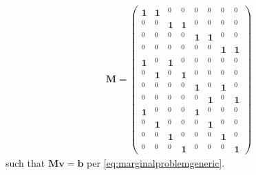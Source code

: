 \documentclass[aps,english,10pt,superscriptaddress,onecolumn,twoside,longbibliography,pra,floatfix,fleqn,nofootinbib]{revtex4-1}
\theoremstyle{definition}
\begin{document}
\begin{align}
\bm{M}=\begin{pmatrix}
 \bm{1} & \bm{1} & {\scriptscriptstyle ^0} & {\scriptscriptstyle ^0} & {\scriptscriptstyle ^0} & {\scriptscriptstyle ^0} & {\scriptscriptstyle ^0} & {\scriptscriptstyle ^0} \\
 {\scriptscriptstyle ^0} & {\scriptscriptstyle ^0} & \bm{1} & \bm{1} & {\scriptscriptstyle ^0} & {\scriptscriptstyle ^0} & {\scriptscriptstyle ^0} & {\scriptscriptstyle ^0} \\
 {\scriptscriptstyle ^0} & {\scriptscriptstyle ^0} & {\scriptscriptstyle ^0} & {\scriptscriptstyle ^0} & \bm{1} & \bm{1} & {\scriptscriptstyle ^0} & {\scriptscriptstyle ^0} \\
 {\scriptscriptstyle ^0} & {\scriptscriptstyle ^0} & {\scriptscriptstyle ^0} & {\scriptscriptstyle ^0} & {\scriptscriptstyle ^0} & {\scriptscriptstyle ^0} & \bm{1} & \bm{1} \\
 \bm{1} & {\scriptscriptstyle ^0} & \bm{1} & {\scriptscriptstyle ^0} & {\scriptscriptstyle ^0} & {\scriptscriptstyle ^0} & {\scriptscriptstyle ^0} & {\scriptscriptstyle ^0} \\
 {\scriptscriptstyle ^0} & \bm{1} & {\scriptscriptstyle ^0} & \bm{1} & {\scriptscriptstyle ^0} & {\scriptscriptstyle ^0} & {\scriptscriptstyle ^0} & {\scriptscriptstyle ^0} \\
 {\scriptscriptstyle ^0} & {\scriptscriptstyle ^0} & {\scriptscriptstyle ^0} & {\scriptscriptstyle ^0} & \bm{1} & {\scriptscriptstyle ^0} & \bm{1} & {\scriptscriptstyle ^0} \\
 {\scriptscriptstyle ^0} & {\scriptscriptstyle ^0} & {\scriptscriptstyle ^0} & {\scriptscriptstyle ^0} & {\scriptscriptstyle ^0} & \bm{1} & {\scriptscriptstyle ^0} & \bm{1} \\
 \bm{1} & {\scriptscriptstyle ^0} & {\scriptscriptstyle ^0} & {\scriptscriptstyle ^0} & \bm{1} & {\scriptscriptstyle ^0} & {\scriptscriptstyle ^0} & {\scriptscriptstyle ^0} \\
 {\scriptscriptstyle ^0} & \bm{1} & {\scriptscriptstyle ^0} & {\scriptscriptstyle ^0} & {\scriptscriptstyle ^0} & \bm{1} & {\scriptscriptstyle ^0} & {\scriptscriptstyle ^0} \\
 {\scriptscriptstyle ^0} & {\scriptscriptstyle ^0} & \bm{1} & {\scriptscriptstyle ^0} & {\scriptscriptstyle ^0} & {\scriptscriptstyle ^0} & \bm{1} & {\scriptscriptstyle ^0} \\
 {\scriptscriptstyle ^0} & {\scriptscriptstyle ^0} & {\scriptscriptstyle ^0} & \bm{1} & {\scriptscriptstyle ^0} & {\scriptscriptstyle ^0} & {\scriptscriptstyle ^0} & \bm{1} 
\end{pmatrix}
\end{align}
such that $\bm{M}\bm{v}=\bm{b}$ per \cref{eq:marginalproblemgeneric}.
\end{document}
